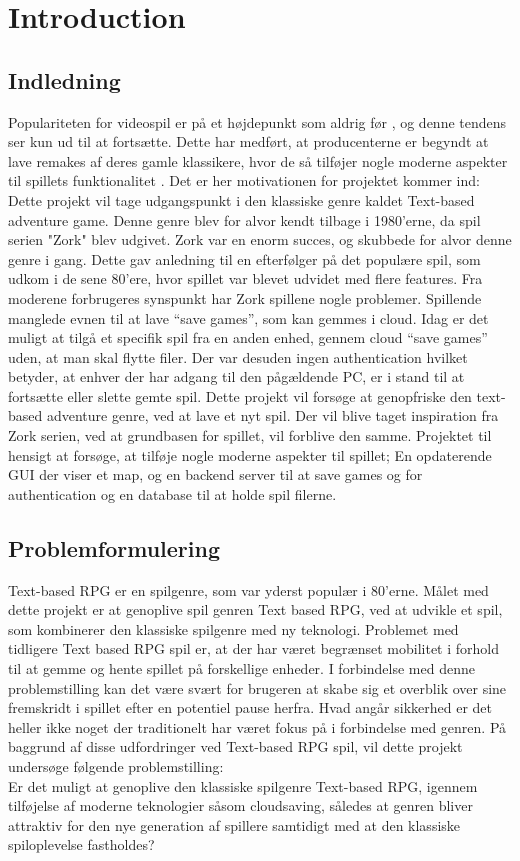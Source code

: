 \newpage
\section{Introduction}
\subsection{Indledning}

Populariteten for videospil er på et højdepunkt som aldrig før \cite{WE-PC}, og denne tendens ser kun ud til at fortsætte. Dette har medført, at producenterne er begyndt at lave remakes af deres gamle klassikere, hvor de så tilføjer nogle moderne aspekter til spillets funktionalitet \cite{Protocol}. Det er her motivationen for projektet kommer ind: \\

Dette projekt vil tage udgangspunkt i den klassiske genre kaldet Text-based adventure game. Denne genre blev for alvor kendt tilbage i 1980'erne, da spil serien "Zork" blev udgivet. Zork var en enorm succes\cite{WikiZork}, og skubbede for alvor denne genre i gang. 
Dette gav anledning til en efterfølger på det populære spil, som udkom i de sene 80’ere, hvor spillet var blevet udvidet med flere features.
Fra moderene forbrugeres synspunkt har Zork spillene nogle problemer. Spillende manglede evnen til at lave ``save games'', som kan gemmes i cloud. 
Idag er det muligt at tilgå et specifik spil fra en anden enhed, gennem cloud ``save games'' uden, at man skal flytte filer. Der var desuden ingen 
authentication hvilket betyder, at enhver der har adgang til den pågældende PC, er i stand til at fortsætte eller slette gemte spil. 
Dette projekt vil forsøge at genopfriske den text-based adventure genre, ved at lave et nyt spil. Der vil blive taget inspiration 
fra Zork serien, ved at grundbasen for spillet, vil forblive den samme. Projektet til hensigt at forsøge, at tilføje nogle moderne aspekter til spillet;
En opdaterende GUI der viser et map, og en backend server til at save games og for authentication og en database til at holde spil filerne.

\subsection{Problemformulering}
Text-based RPG er en spilgenre, som var yderst populær i 80’erne. Målet med dette projekt er at genoplive spil genren Text based RPG, ved at udvikle et spil, 
som kombinerer den klassiske spilgenre med ny teknologi. Problemet med tidligere Text based RPG spil er, at der har været begrænset mobilitet i forhold 
til at gemme og hente spillet på forskellige enheder. I forbindelse med denne problemstilling kan det være svært for brugeren at skabe sig et overblik over
sine fremskridt i spillet efter en potentiel pause herfra. Hvad angår sikkerhed er det heller ikke noget der traditionelt har været fokus på i forbindelse med genren. 
På baggrund af disse udfordringer ved Text-based RPG spil, vil dette projekt undersøge følgende problemstilling: \\

Er det muligt at genoplive den klassiske spilgenre Text-based RPG, igennem tilføjelse af moderne teknologier såsom cloudsaving, således at genren bliver attraktiv
for den nye generation af spillere samtidigt med at den klassiske spiloplevelse fastholdes?
\newpage